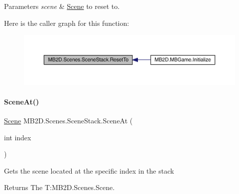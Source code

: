 \begin{DoxyParams}{Parameters}
{\em scene} & \hyperlink{class_m_b2_d_1_1_scenes_1_1_scene}{Scene} to reset to.\\
\hline
\end{DoxyParams}
Here is the caller graph for this function\+:
\nopagebreak
\begin{figure}[H]
\begin{center}
\leavevmode
\includegraphics[width=350pt]{class_m_b2_d_1_1_scenes_1_1_scene_stack_a521a38426d3e85caeb53b2909b623562_icgraph}
\end{center}
\end{figure}
\hypertarget{class_m_b2_d_1_1_scenes_1_1_scene_stack_a84b1a5b2771f6c663eece04bcafd5416}{}\label{class_m_b2_d_1_1_scenes_1_1_scene_stack_a84b1a5b2771f6c663eece04bcafd5416} 
\paragraph{\texorpdfstring{Scene\+At()}{SceneAt()}}
{\footnotesize\ttfamily \hyperlink{class_m_b2_d_1_1_scenes_1_1_scene}{Scene} M\+B2\+D.\+Scenes.\+Scene\+Stack.\+Scene\+At (\begin{DoxyParamCaption}\item[{int}]{index }\end{DoxyParamCaption})\hspace{0.3cm}{\ttfamily [inline]}}



Gets the scene located at the specific index in the stack 

\begin{DoxyReturn}{Returns}
The T\+:\+M\+B2\+D.\+Scenes.\+Scene.
\end{DoxyReturn}

